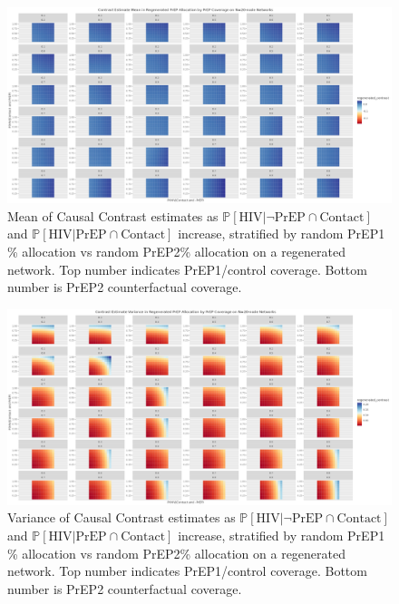 \documentclass{article}
\theoremstyle{definition}
\begin{document}
\begin{figure}[H]
    \centering
    \includegraphics[width=\linewidth]{Corrected Figures/PrEP Regenerated Mean Plots.png}
    \caption{Mean of Causal Contrast estimates as $\mathbb{P}\left[\text{HIV} \vert \neg \text{PrEP} \cap \text{Contact}\right]$ and $\mathbb{P}\left[\text{HIV} \vert \text{PrEP} \cap \text{Contact}\right]$ increase, stratified by  random PrEP1 \% allocation vs random PrEP2\% allocation on a regenerated network. Top number indicates PrEP1/control coverage. Bottom number is PrEP2 counterfactual coverage.}
    \label{fig:Figure S4.15}
\end{figure}
\begin{figure}[H]
    \centering
    \includegraphics[width=\linewidth]{Corrected Figures/PrEP Regenerated Variance Plots.png}
    \caption{Variance of Causal Contrast estimates as $\mathbb{P}\left[\text{HIV} \vert \neg \text{PrEP} \cap \text{Contact}\right]$ and $\mathbb{P}\left[\text{HIV} \vert \text{PrEP} \cap \text{Contact}\right]$ increase, stratified by random PrEP1 \% allocation vs random PrEP2\% allocation on a regenerated network. Top number indicates PrEP1/control coverage. Bottom number is PrEP2 counterfactual coverage. }
    \label{fig:Figure S4.16}
\end{figure}
\end{document}
